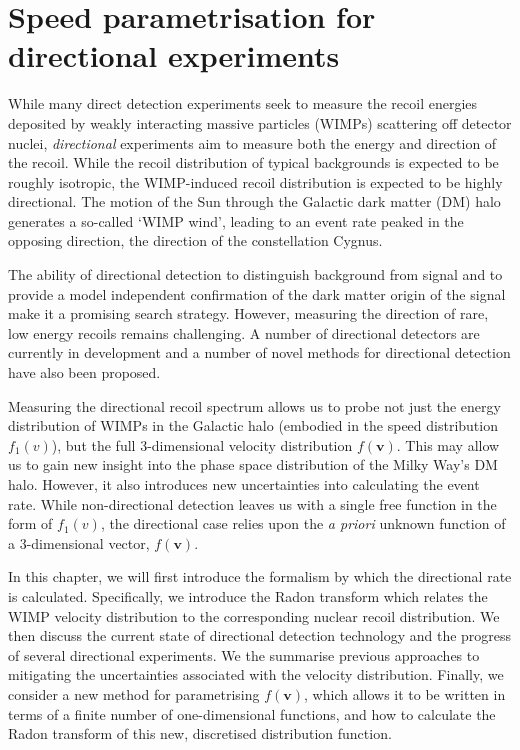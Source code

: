 \chapter[Directional detection]{Speed parametrisation for directional experiments}


While many direct detection experiments seek to measure the recoil energies deposited by weakly interacting massive particles (WIMPs) scattering off detector nuclei, \textit{directional} experiments aim to measure both the energy and direction of the recoil. While the recoil distribution of typical backgrounds is expected to be roughly isotropic, the WIMP-induced recoil distribution is expected to be highly directional. The motion of the Sun through the Galactic dark matter (DM) halo generates a so-called `WIMP wind', leading to an event rate peaked in the opposing direction, the direction of the constellation Cygnus. 

The ability of directional detection to distinguish background from signal and to provide a model independent confirmation of the dark matter origin of the signal make it a promising search strategy. However, measuring the direction of rare, low energy recoils remains challenging. A number of directional detectors are currently in development and a number of novel methods for directional detection have also been proposed.

Measuring the directional recoil spectrum allows us to probe not just the energy distribution of WIMPs in the Galactic halo (embodied in the speed distribution $f_1(v)$), but the full 3-dimensional velocity distribution $f(\textbf{v})$. This may allow us to gain new insight into the phase space distribution of the Milky Way's DM halo. However, it also introduces new uncertainties into calculating the event rate. While non-directional detection leaves us with a single free function in the form of $f_1(v)$, the directional case relies upon the \textit{a priori} unknown function of a 3-dimensional vector, $f(\textbf{v})$.

In this chapter, we will first introduce the formalism by which the directional rate is calculated. Specifically, we introduce the Radon transform which relates the WIMP velocity distribution to the corresponding nuclear recoil distribution.  We then discuss the current state of directional detection technology and the progress of several directional experiments. We the summarise previous approaches to mitigating the uncertainties associated with the velocity distribution. Finally, we consider a new method for parametrising $f(\textbf{v})$, which allows it to be written in terms of a finite number of one-dimensional functions, and how to calculate the Radon transform of this new, discretised distribution function.

